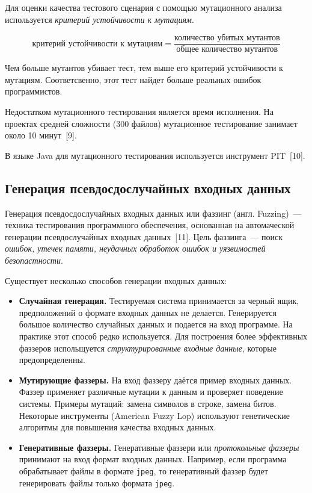 Для оценки качества тестового сценария с помощью мутационного анализа используется \textit{критерий устойчивости к мутациям}.

\[ \text{критерий устойчивости к мутациям} = \frac{\text{количество убитых мутантов}}{\text{общее количество мутантов}}  \]

Чем больше мутантов убивает тест, тем выше его критерий устойчивости к мутациям. Соответсвенно, этот тест найдет больше реальных ошибок программистов. 

Недостатком мутационного тестирования является время исполнения. На проектах средней сложности (300 файлов) мутационное тестирование занимает около 10 минут~[9].

В языке Java для мутационного тестирования используется инструмент PIT~[10].

\subsection{Генерация псевдосдослучайных входных данных} 
 
Генерация псевдосдослучайных входных данных или фаззинг (англ. Fuzzing)~--- техника тестирования программного обеспечения, основанная на автомаческой генерации псевдослучайных входных данных~[11]. Цель фаззинга~--- поиск \textit{ошибок, утечек памяти, неудачных обработок ошибок и уязвимостей безопастности}.

Существует несколько способов генерации входных данных:

\begin{itemize}
	\item \textbf{Случайная генерация.} Тестируемая система принимается за черный ящик, предположений о формате входных данных не делается. Генерируется большое количество случайных данных и подается на вход программе. На практике этот способ редко используется. Для построения более эффективных фаззеров испольщуется \textit{структурированные входные данные}, которые предопределенны.
	\item \textbf{Мутирующие фаззеры.} На вход фаззеру даётся пример входных данных. Фаззер применяет различные мутации к данным и проверяет поведение системы. Примеры мутаций: замена символов в строке, замена битов. Некоторые инструменты (American Fuzzy Lop) используют генетические алгоритмы для повышения качества входных данных.
	\item \textbf{Генеративные фаззеры.} Генеративные фаззери или \textit{протокольные фаззеры} принимают на вход формат входных данных. Например, если программа обрабатывает файлы в формате \texttt{jpeg}, то генеративный фаззер будет генерировать файлы только формата \texttt{jpeg}.
\end{itemize}
 
